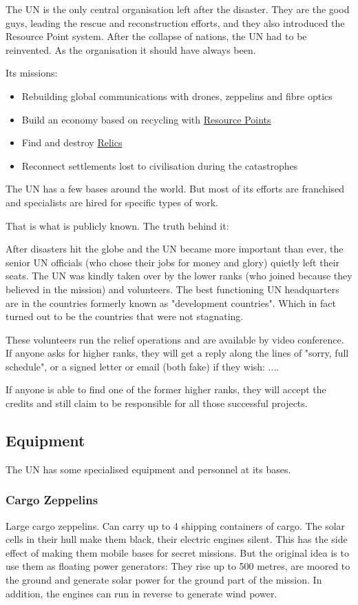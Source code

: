 The UN is the only central organisation left after the disaster. They are the good guys, leading the rescue and reconstruction efforts, and they also introduced the Resource Point system. After the collapse of nations, the UN had to be reinvented. As the organisation it should have always been.

Its missions:

\begin{itemize}
    \item Rebuilding global communications with drones, zeppelins and fibre optics
    \item Build an economy based on recycling with \hyperref[sec:Resource Points]{Resource Points}
    \item Find and destroy \hyperref[sec: Relic]{Relics}
    \item Reconnect settlements lost to civilisation during the catastrophes
\end{itemize}

The UN has a few bases around the world. But most of its efforts are franchised and specialists are hired for specific types of work.

That is what is publicly known. The truth behind it:

After disasters hit the globe and the UN became more important than ever, the senior UN officials (who chose their jobs for money and glory) quietly left their seats. The UN was kindly taken over by the lower ranks (who joined because they believed in the mission) and volunteers. The best functioning UN headquarters are in the countries formerly known as "development countries". Which in fact turned out to be the countries that were not stagnating.

These volunteers run the relief operations and are available by video conference. If anyone asks for higher ranks, they will get a reply along the lines of "sorry, full schedule", or a signed letter or email (both fake) if they wish: ....

If anyone is able to find one of the former higher ranks, they will accept the credits and still claim to be responsible for all those successful projects.

\subsection{Equipment}

The UN has some specialised equipment and personnel at its bases.

\subsubsection{Cargo Zeppelins}
\label{sec: UN Cargo Zeppelins}
Large cargo zeppelins. Can carry up to 4 shipping containers of cargo. The solar cells in their hull make them black, their electric engines silent. This has the side effect of making them mobile bases for secret missions. But the original idea is to use them as floating power generators: They rise up to 500 metres, are moored to the ground and generate solar power for the ground part of the mission. In addition, the engines can run in reverse to generate wind power.

